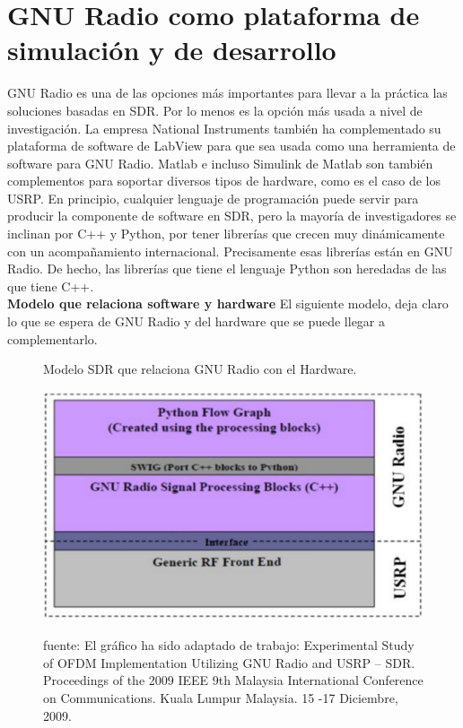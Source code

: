 
\section{GNU Radio como plataforma de simulación y de desarrollo}

GNU Radio es una de las opciones más importantes para llevar a la práctica las soluciones basadas en SDR. Por lo menos es la opción más usada a nivel de investigación. La empresa National Instruments también ha complementado su plataforma de software de LabView para que sea usada como una herramienta de software para GNU Radio. Matlab e incluso Simulink de Matlab son también complementos para soportar diversos tipos de hardware, como es el caso de los USRP. En principio, cualquier lenguaje de programación puede servir para producir la componente de software en SDR, pero la mayoría de investigadores se inclinan por C++ y Python, por tener librerías que crecen muy dinámicamente con un acompañamiento internacional. Precisamente esas librerías están en GNU Radio. De hecho, las librerías que tiene el lenguaje Python son heredadas de las que tiene C++.\\

\textbf{Modelo que relaciona software y hardware}
El siguiente modelo, deja claro lo que se espera de GNU Radio y del hardware que se puede llegar a complementarlo. \\

\vspace{400px}
\begin{figure}[h!]
	\captionsetup{justification = raggedright, singlelinecheck = false}
	\caption{Modelo SDR que relaciona GNU Radio con el Hardware.} 
	\centering
	\includegraphics[scale=0.7]{Imagenes/Modelo-SDR.png}
	\label{fig:Modelo-SDR}
		\caption*{fuente:  El gráfico ha sido adaptado de trabajo: Experimental Study of OFDM Implementation Utilizing GNU Radio and USRP – SDR. Proceedings of the 2009 IEEE 9th Malaysia International Conference on Communications. Kuala Lumpur Malaysia. 15 -17 Diciembre, 2009.
		}
\end{figure}


